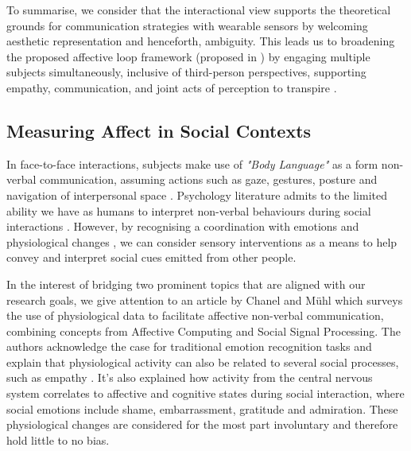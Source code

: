 



To summarise, we consider that the interactional view supports the theoretical grounds for communication strategies with wearable sensors by welcoming aesthetic representation and henceforth, ambiguity. This leads us to broadening the proposed affective loop framework (proposed in \cite{hook_affective_2009}) by engaging multiple subjects simultaneously, inclusive of third-person perspectives, supporting empathy, communication, and joint acts of perception to transpire \cite{turmo_vidal_designing_2021,francoise_designing_2017}.

\subsection{Measuring Affect in Social Contexts}
\label{lit_reivew:ssp}

In face-to-face interactions, subjects make use of \textit{"Body Language"} as a form non-verbal communication, assuming actions such as gaze, gestures, posture and navigation of interpersonal space \cite{dobre_immersive_2022}. Psychology literature admits to the limited ability we have as humans to interpret non-verbal behaviours during social interactions \cite{joseph_emotional_2010}. However, by recognising a coordination with emotions and physiological changes \cite{mayer_human_2008}, we can consider sensory interventions as a means to help convey and interpret social cues emitted from other people.

In the interest of bridging two prominent topics that are aligned with our research goals, we give attention to an article by Chanel and Mühl \cite{chanel_connecting_2015} which surveys the use of physiological data to facilitate affective non-verbal communication, combining concepts from Affective Computing and Social Signal Processing. The authors acknowledge the case for traditional emotion recognition tasks and explain that physiological activity can also be related to several social processes, such as empathy \cite{levenson_empathy_1992}. It's also explained how activity from the central nervous system correlates to affective and cognitive states during social interaction, where social emotions include shame, embarrassment, gratitude and admiration. These physiological changes are considered for the most part involuntary and therefore hold little to no bias.

